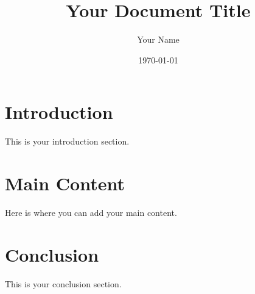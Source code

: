 \documentclass{article}
\title{Your Document Title}
\author{Your Name}
\date{\today}  %
\begin{document}
\maketitle  %

\section{Introduction}
This is your introduction section.

\section{Main Content}
Here is where you can add your main content.

\section{Conclusion}
This is your conclusion section.
\end{document}
